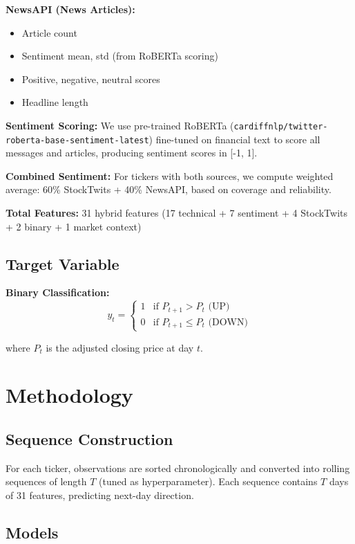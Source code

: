 \documentclass[10pt,twocolumn]{article}
\begin{document}
\textbf{NewsAPI (News Articles):}
\begin{itemize}
\item Article count
\item Sentiment mean, std (from RoBERTa scoring)
\item Positive, negative, neutral scores
\item Headline length
\end{itemize}

\textbf{Sentiment Scoring:} We use pre-trained RoBERTa (\texttt{cardiffnlp/twitter-roberta-base-sentiment-latest}) fine-tuned on financial text to score all messages and articles, producing sentiment scores in [-1, 1].

\textbf{Combined Sentiment:} For tickers with both sources, we compute weighted average: 60\% StockTwits + 40\% NewsAPI, based on coverage and reliability.

\textbf{Total Features:} 31 hybrid features (17 technical + 7 sentiment + 4 StockTwits + 2 binary + 1 market context)

\subsection{Target Variable}

\textbf{Binary Classification:}
\begin{equation}
y_t = \begin{cases}
1 & \text{if } P_{t+1} > P_t \text{ (UP)} \\
0 & \text{if } P_{t+1} \leq P_t \text{ (DOWN)}
\end{cases}
\end{equation}

where $P_t$ is the adjusted closing price at day $t$.

\section{Methodology}

\subsection{Sequence Construction}

For each ticker, observations are sorted chronologically and converted into rolling sequences of length $T$ (tuned as hyperparameter). Each sequence contains $T$ days of 31 features, predicting next-day direction.

\subsection{Models}
\end{document}
